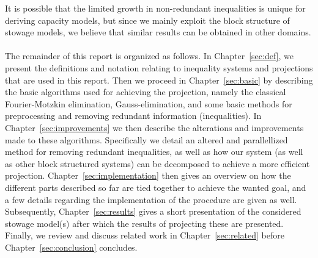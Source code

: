 It is possible that the limited growth in non-redundant inequalities is unique for deriving capacity models, but since we mainly exploit the block structure of stowage models, we believe that similar results can be obtained in other domains.
\\
\\
The remainder of this report is organized as follows.
In Chapter~\ref{sec:def}, we present the definitions and notation relating to inequality systems and projections that are used in this report. 
Then we proceed in Chapter~\ref{sec:basic} by describing the basic algorithms used for achieving the projection, namely the classical Fourier-Motzkin elimination, Gauss-elimination, and some basic methods for preprocessing and removing redundant information (inequalities). 
In Chapter~\ref{sec:improvements} we then describe the alterations and improvements made to these algorithms. Specifically we detail an altered and parallellized method for removing redundant inequalities, as well as how our system (as well as other block structured systems) can be decomposed to achieve a more efficient projection.    
Chapter~\ref{sec:implementation} then gives an overview on how the different parts described so far are tied together to achieve the wanted goal, and a few details regarding the implementation of the procedure are given as well.
Subsequently, Chapter~\ref{sec:results} gives a short presentation of the considered stowage model(s) after which the results of projecting these are presented. 
Finally, we review and discuss related work in Chapter~\ref{sec:related} before Chapter~\ref{sec:conclusion} concludes.











